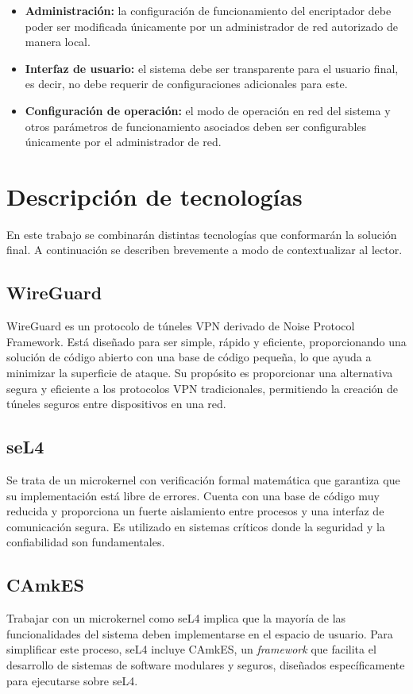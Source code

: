 \begin{itemize}
    \item \textbf{Administración:} la configuración de funcionamiento del  encriptador debe poder ser modificada únicamente por un administrador de red autorizado de manera local.
    \item \textbf{Interfaz de usuario:} el sistema debe ser transparente para el usuario final, es decir, no debe requerir de configuraciones adicionales para este.
    \item \textbf{Configuración de operación:} el modo de operación en red del sistema y otros parámetros de funcionamiento asociados deben ser configurables únicamente por el administrador de red.
\end{itemize}
\clearpage

\section{Descripción de tecnologías}
En este trabajo se combinarán distintas tecnologías que conformarán la solución final. A continuación se describen brevemente a modo de contextualizar al lector.

\subsection{WireGuard}
WireGuard es un protocolo de túneles VPN derivado de Noise Protocol Framework. Está diseñado para ser simple, rápido y eficiente, proporcionando una solución de código abierto con una base de código pequeña, lo que ayuda a minimizar la superficie de ataque. Su propósito es proporcionar una alternativa segura y eficiente a los protocolos VPN tradicionales, permitiendo la creación de túneles seguros entre dispositivos en una red. 

\subsection{seL4}
Se trata de un microkernel con verificación formal matemática que garantiza que su implementación está libre de errores. Cuenta con una base de código muy reducida y proporciona un fuerte aislamiento entre procesos y una interfaz de comunicación segura. Es utilizado en sistemas críticos donde la seguridad y la confiabilidad son fundamentales. 

\subsection{CAmkES}
Trabajar con un microkernel como seL4 implica que la mayoría de las funcionalidades del sistema deben implementarse en el espacio de usuario. Para simplificar este proceso, seL4 incluye CAmkES, un \textit{framework} que facilita el desarrollo de sistemas de software modulares y seguros, diseñados específicamente para ejecutarse sobre seL4.

